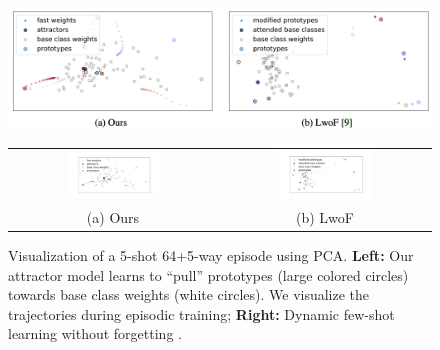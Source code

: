 \begin{figure}[t]
\vspace{-0.2in}
\centering
\iflatexml
\includegraphics[width=6\textwidth]{figures/attractor_progress.png}
\else
\begin{minipage}[c]{\textwidth}
\centering
\begin{small}
\begin{tabular}{cc}
\includegraphics[width=0.47\textwidth,trim={2.8cm 1cm 2.5cm 1cm},clip]{figures/attractor_progress_9.pdf} & 
\includegraphics[width=0.47\textwidth,trim={2.8cm 1cm 2.5cm 1cm},clip]{figures/lwof_progress_9.pdf}\\
(a) Ours & (b) LwoF \cite{lwof}
\end{tabular}
\end{small}
\end{minipage}
\fi
\caption{Visualization of a 5-shot 64+5-way episode using PCA. 
\textbf{Left:} Our attractor model learns to
``pull'' prototypes (large colored circles) towards base class weights (white circles). We visualize the trajectories during episodic training; \textbf{Right:} Dynamic few-shot learning without
forgetting \cite{lwof}.}
\label{fig:vizproc}
\vspace{-0.1in}
\end{figure}